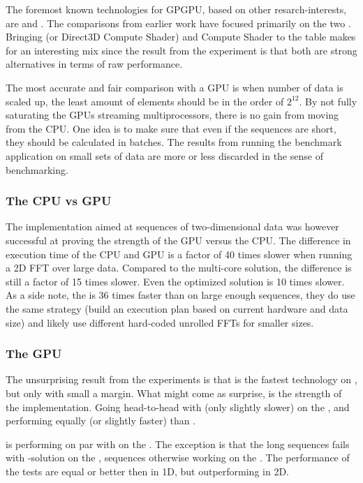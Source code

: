 The foremost known technologies for GPGPU, based on other resarch-interests, are {\CU} and {\OCL}. The comparisons from earlier work have focused primarily on the two \cite{fang2011comprehensive, park2011design, su2012overview}. Bringing {\DX} (or Direct3D Compute Shader) and {\GL} Compute Shader to the table makes for an interesting mix since the result from the experiment is that both are strong alternatives in terms of raw performance.

The most accurate and fair comparison with a GPU is when number of data is scaled up, the least amount of elements should be in the order of $2^{12}$. By not fully saturating the GPUs streaming multiprocessors, there is no gain from moving from the CPU. One idea is to make sure that even if the sequences are short, they should be calculated in batches. The results from running the benchmark application on small sets of data are more or less discarded in the sense of benchmarking.

\subsubsection{The CPU vs GPU}

The implementation aimed at sequences of two-dimensional data was however successful at proving the strength of the GPU versus the CPU. The difference in execution time of the CPU and GPU is a factor of 40 times slower when running a 2D FFT over large data. Compared to the multi-core {\OMP} solution, the difference is still a factor of 15 times slower. Even the optimized {\FFTW} solution is 10 times slower. As a side note, the {\CUFFT} is 36 times faster than {\FFTW} on large enough sequences, they do use the same strategy (build an execution plan based on current hardware and data size) and likely use different hard-coded unrolled FFTs for smaller sizes.

\subsubsection{The GPU}

The unsurprising result from the experiments is that {\CU} is the fastest technology on {\NVCARD}, but only with small a margin. What might come as surprise, is the strength of the {\DX} implementation. Going head-to-head with {\CU} (only slightly slower) on the {\NVCARD}, and performing equally (or slightly faster) than {\OCL}.

{\GL} is performing on par with {\DX} on the {\AMDCARD}. The exception is that the long sequences fails with {\GL}-solution on the {\AMDCARD}, sequences otherwise working on the {\NVCARD}. The performance of the {\GL} tests are equal or better then {\OCL} in 1D, but outperforming {\OCL} in 2D.

